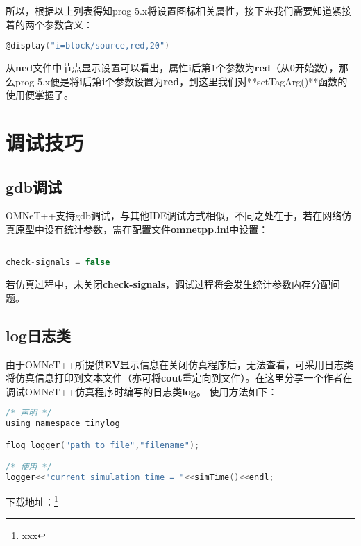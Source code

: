 所以，根据以上列表得知prog-5.x将设置图标相关属性，接下来我们需要知道紧接着的两个参数含义：

\begin{lstlisting}[language=c]
@display("i=block/source,red,20")
\end{lstlisting}

从\textbf{ned}文件中节点显示设置可以看出，属性\textbf{i}后第1个参数为\textbf{red}（从0开始数），那么prog-5.x便是将\textbf{i}后第\textbf{i}个参数设置为\textbf{red}，到这里我们对**setTagArg()**函数的使用便掌握了。

\section{调试技巧}
\label{调试技巧}

\subsection{gdb调试}
\label{gdb调试}

OMNeT++支持gdb调试，与其他IDE调试方式相似，不同之处在于，若在网络仿真原型中设有统计参数，需在配置文件\textbf{omnetpp.ini}中设置：

\begin{lstlisting}[language=c]

check-signals = false

\end{lstlisting}

若仿真过程中，未关闭\textbf{check-signals}，调试过程将会发生统计参数内存分配问题。

\subsection{log日志类}
\label{log日志类}

由于OMNeT++所提供\textbf{EV}显示信息在关闭仿真程序后，无法查看，可采用日志类将仿真信息打印到文本文件（亦可将\textbf{cout}重定向到文件）。在这里分享一个作者在调试OMNeT++仿真程序时编写的日志类\textbf{log}。
使用方法如下：

\begin{lstlisting}[language=c]
/* 声明 */
using namespace tinylog

flog logger("path to file","filename"); 

/* 使用 */
logger<<"current simulation time = "<<simTime()<<endl;

\end{lstlisting}

下载地址：\href{xxx}{}\footnote{\href{xxx}{xxx}}

